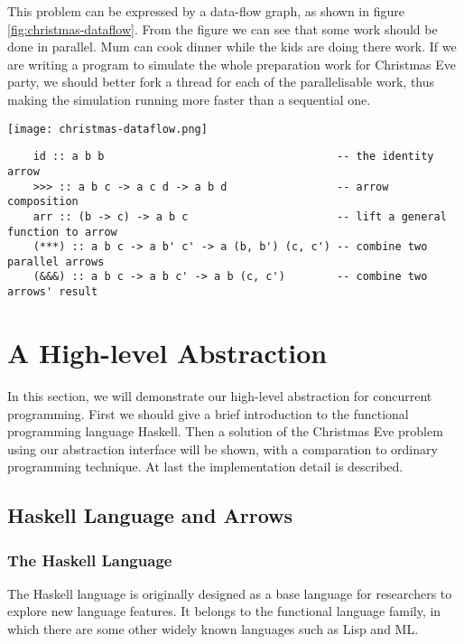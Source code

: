 \documentclass[conference]{IEEEtran}
\begin{document}
This problem can be expressed by a data-flow graph, as shown in figure \ref{fig:christmas-dataflow}.
From the figure we can see that some work should be done in parallel. Mum can cook dinner while
the kids are doing there work. If we are writing a program to simulate the whole preparation work
for Christmas Eve party, we should better fork a thread for each of the parallelisable work, thus
making the simulation running more faster than a sequential one.
\begin{figure*}[!t]
  \centering
  \texttt{[image: christmas-dataflow.png]}
  \caption{The Chistmas Eve party data-flow}
  \label{fig:christmas-dataflow}
\end{figure*}
\begin{figure*}
  \begin{verbatim}
    id :: a b b                                    -- the identity arrow
    >>> :: a b c -> a c d -> a b d                 -- arrow composition
    arr :: (b -> c) -> a b c                       -- lift a general function to arrow
    (***) :: a b c -> a b' c' -> a (b, b') (c, c') -- combine two parallel arrows
    (&&&) :: a b c -> a b c' -> a b (c, c')        -- combine two arrows' result
  \end{verbatim}
  \caption{Combinators for arrow programming}
  \label{fig:arrows-interface}
\end{figure*}

\section{A High-level Abstraction}\label{sec:a-high-level-abstraction}
In this section, we will demonstrate our high-level abstraction for concurrent programming. First we
should give a brief introduction to the functional programming language Haskell. Then a solution of
the Christmas Eve problem using our abstraction interface will be shown, with a comparation to ordinary
programming technique. At last the implementation detail is described.

\subsection{Haskell Language and Arrows}\label{subsec:haskell-and-arrows}
\subsubsection{The Haskell Language}
The Haskell language is originally designed as a base language for researchers to explore new language
features. It belongs to the functional language family, in which there are some other widely known
languages such as Lisp and ML. 
\end{document}
